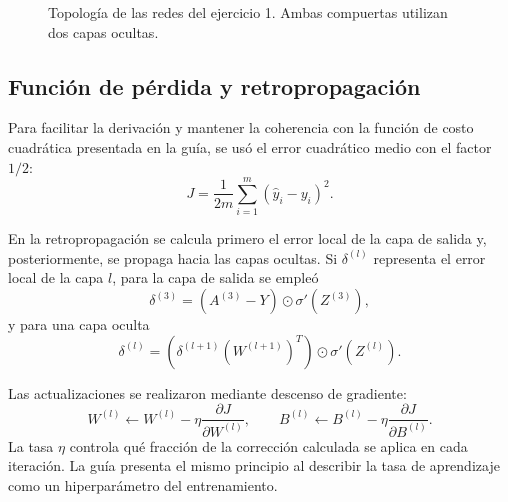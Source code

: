 \documentclass[14pt,twoside]{article}
\begin{document}
\begin{figure}[H]
\centering
{}
\caption{Topología de las redes del ejercicio 1. Ambas compuertas utilizan dos capas ocultas.}
\end{figure}

\subsection{Función de pérdida y retropropagación}

Para facilitar la derivación y mantener la coherencia con la función de costo cuadrática presentada en la guía, se usó el error cuadrático medio con el factor $1/2$:
\[
J=\frac{1}{2m}\sum_{i=1}^{m}\left(\widehat{y}_i-y_i\right)^2.
\]

En la retropropagación se calcula primero el error local de la capa de salida y, posteriormente, se propaga hacia las capas ocultas. Si $\delta^{(l)}$ representa el error local de la capa $l$, para la capa de salida se empleó
\[
\delta^{(3)}=\left(A^{(3)}-Y\right)\odot \sigma'\left(Z^{(3)}\right),
\]
y para una capa oculta
\[
\delta^{(l)}=\left(\delta^{(l+1)}(W^{(l+1)})^T\right)\odot\sigma'\left(Z^{(l)}\right).
\]

Las actualizaciones se realizaron mediante descenso de gradiente:
\[
W^{(l)}\leftarrow W^{(l)}-\eta\frac{\partial J}{\partial W^{(l)}},
\qquad
B^{(l)}\leftarrow B^{(l)}-\eta\frac{\partial J}{\partial B^{(l)}}.
\]
La tasa $\eta$ controla qué fracción de la corrección calculada se aplica en cada iteración. La guía presenta el mismo principio al describir la tasa de aprendizaje como un hiperparámetro del entrenamiento. \cite{martinez2026}
\end{document}
